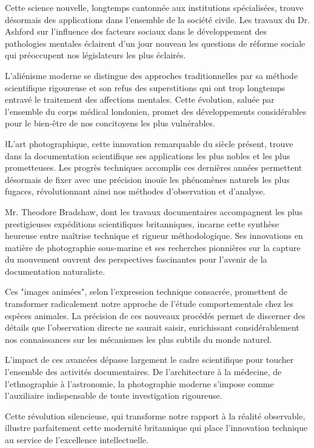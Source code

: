 \documentclass{news}
\begin{document}
Cette science nouvelle, longtemps cantonnée aux institutions spécialisées, trouve désormais des applications dans l'ensemble de la société civile. Les travaux du Dr. Ashford sur l'influence des facteurs sociaux dans le développement des pathologies mentales éclairent d'un jour nouveau les questions de réforme sociale qui préoccupent nos législateurs les plus éclairés.

L'aliénisme moderne se distingue des approches traditionnelles par sa méthode scientifique rigoureuse et son refus des superstitions qui ont trop longtemps entravé le traitement des affections mentales. Cette évolution, saluée par l'ensemble du corps médical londonien, promet des développements considérables pour le bien-être de nos concitoyens les plus vulnérables.

\l{L}'art photographique, cette innovation remarquable du siècle présent, trouve dans la documentation scientifique ses applications les plus nobles et les plus prometteuses. Les progrès techniques accomplis ces dernières années permettent désormais de fixer avec une précision inouïe les phénomènes naturels les plus fugaces, révolutionnant ainsi nos méthodes d'observation et d'analyse.

Mr. Theodore Bradshaw, dont les travaux documentaires accompagnent les plus prestigieuses expéditions scientifiques britanniques, incarne cette synthèse heureuse entre maîtrise technique et rigueur méthodologique. Ses innovations en matière de photographie sous-marine et ses recherches pionnières sur la capture du mouvement ouvrent des perspectives fascinantes pour l'avenir de la documentation naturaliste.

Ces "images animées", selon l'expression technique consacrée, promettent de transformer radicalement notre approche de l'étude comportementale chez les espèces animales. La précision de ces nouveaux procédés permet de discerner des détails que l'observation directe ne saurait saisir, enrichissant considérablement nos connaissances sur les mécanismes les plus subtils du monde naturel.

L'impact de ces avancées dépasse largement le cadre scientifique pour toucher l'ensemble des activités documentaires. De l'architecture à la médecine, de l'ethnographie à l'astronomie, la photographie moderne s'impose comme l'auxiliaire indispensable de toute investigation rigoureuse.

Cette révolution silencieuse, qui transforme notre rapport à la réalité observable, illustre parfaitement cette modernité britannique qui place l'innovation technique au service de l'excellence intellectuelle.
\end{document}
